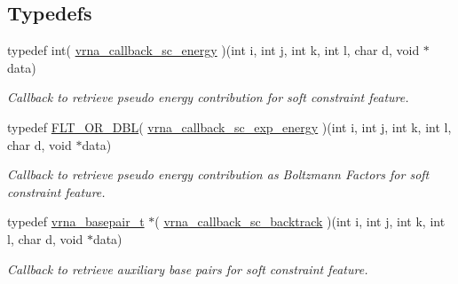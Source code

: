 \subsection*{Typedefs}
\begin{DoxyCompactItemize}
\item 
typedef int( \hyperlink{group__generalized__sc_ga2f3d2d2333e5a616e0f5cd4823780c0c}{vrna\+\_\+callback\+\_\+sc\+\_\+energy} )(int i, int j, int k, int l, char d, void $\ast$data)
\begin{DoxyCompactList}\small\item\em Callback to retrieve pseudo energy contribution for soft constraint feature. \end{DoxyCompactList}\item 
typedef \hyperlink{group__data__structures_ga31125aeace516926bf7f251f759b6126}{F\+L\+T\+\_\+\+O\+R\+\_\+\+D\+B\+L}( \hyperlink{group__generalized__sc_ga28d5138cc47eb7a5116c87518fd076a9}{vrna\+\_\+callback\+\_\+sc\+\_\+exp\+\_\+energy} )(int i, int j, int k, int l, char d, void $\ast$data)
\begin{DoxyCompactList}\small\item\em Callback to retrieve pseudo energy contribution as Boltzmann Factors for soft constraint feature. \end{DoxyCompactList}\item 
typedef \hyperlink{group__data__structures_gac8c5669d3fb813cacf506489689305ce}{vrna\+\_\+basepair\+\_\+t} $\ast$( \hyperlink{group__generalized__sc_ga1157aec50aa078464b868b5d2245ebf5}{vrna\+\_\+callback\+\_\+sc\+\_\+backtrack} )(int i, int j, int k, int l, char d, void $\ast$data)
\begin{DoxyCompactList}\small\item\em Callback to retrieve auxiliary base pairs for soft constraint feature. \end{DoxyCompactList}\end{DoxyCompactItemize}
